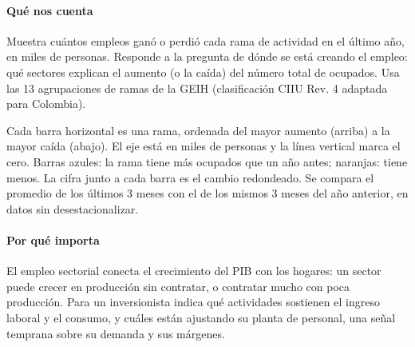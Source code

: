 \paragraph{Qué nos cuenta}
Muestra cuántos empleos ganó o perdió cada rama de actividad en el último año, en miles de personas. Responde a la pregunta de dónde se está creando el empleo: qué sectores explican el aumento (o la caída) del número total de ocupados. Usa las 13 agrupaciones de ramas de la GEIH (clasificación CIIU Rev. 4 adaptada para Colombia).

\begin{leer}
Cada barra horizontal es una rama, ordenada del mayor aumento (arriba) a la mayor caída (abajo). El eje está en miles de personas y la línea vertical marca el cero. Barras azules: la rama tiene más ocupados que un año antes; naranjas: tiene menos. La cifra junto a cada barra es el cambio redondeado. Se compara el promedio de los últimos 3 meses con el de los mismos 3 meses del año anterior, en datos sin desestacionalizar.
\end{leer}

\paragraph{Por qué importa}
El empleo sectorial conecta el crecimiento del PIB con los hogares: un sector puede crecer en producción sin contratar, o contratar mucho con poca producción. Para un inversionista indica qué actividades sostienen el ingreso laboral y el consumo, y cuáles están ajustando su planta de personal, una señal temprana sobre su demanda y sus márgenes.

